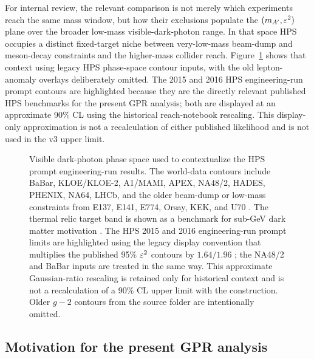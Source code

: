 For internal review, the relevant comparison is not merely which experiments reach the
same mass window, but how their exclusions populate the $(m_{A^\prime},\varepsilon^2)$ plane
over the broader low-mass visible-dark-photon range. In that space HPS occupies a
distinct fixed-target niche between very-low-mass beam-dump and meson-decay constraints
and the higher-mass collider reach. Figure~\ref{fig:hps-engineering-phase-space}
shows that context using legacy HPS phase-space contour inputs, with the old
lepton-anomaly overlays deliberately omitted. The 2015 and 2016 HPS engineering-run
prompt contours are highlighted because they are the directly relevant published HPS
benchmarks for the present GPR analysis; both are displayed at an approximate 90\% CL
using the historical reach-notebook rescaling. This display-only approximation is not a
recalculation of either published likelihood and is not used in the v3 upper limit.

\begin{figure}[H]
\centering
{}
\caption{Visible dark-photon phase space used to contextualize the HPS prompt
engineering-run results. The world-data contours include BaBar, KLOE/KLOE-2, A1/MAMI,
APEX, NA48/2, HADES, PHENIX, NA64, LHCb, and the older beam-dump or low-mass
constraints from E137, E141, E774, Orsay, KEK, and U70
\cite{BaBarDarkPhoton2014,KLOE2013,KLOE22015,A1MAMI2014,APEX2011,
NA48DarkPhoton2015,HADESDarkPhoton2014,PHENIXDarkPhoton2015,NA64DarkPhoton2018,
NA64X17Visible2021,LHCbDarkPhoton2020,E137BeamDump1988,E141BeamDump1987,
E774BeamDump1991,OrsayBeamDump1989,KEKBeamDump1986,U70DarkPhoton2014}. The thermal
relic target band is shown as a benchmark for sub-GeV dark matter motivation
\cite{EssigEtAl2011}. The HPS 2015 and 2016 engineering-run prompt limits are
highlighted using the legacy display convention that multiplies the published 95\%
$\varepsilon^2$ contours by $1.64/1.96$ \cite{HPS2015DarkPhoton,HPS2016PromptLong}; the
NA48/2 and BaBar inputs are treated in the same way. This approximate Gaussian-ratio
rescaling is retained only for historical context and is not a recalculation of a
90\% CL upper limit with the \CLs{} construction. Older $g-2$ contours from the source
folder are intentionally omitted.}
\label{fig:hps-engineering-phase-space}
\end{figure}

\subsection{Motivation for the present GPR analysis}

